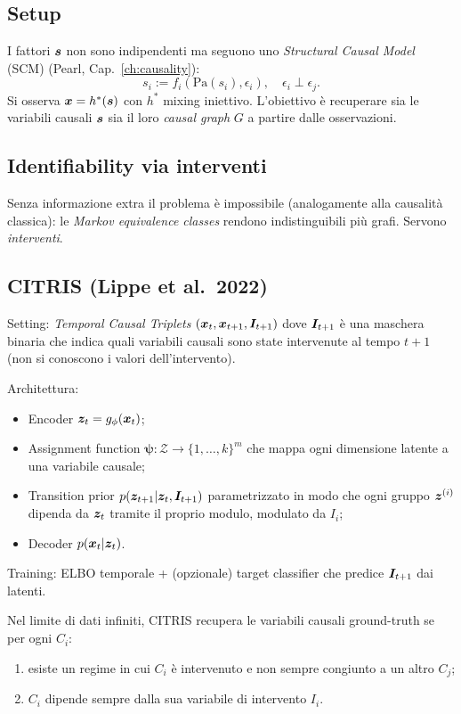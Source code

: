 \subsection{Setup}
I fattori $\bm{s}$ non sono indipendenti ma seguono uno \emph{Structural Causal Model} (SCM) (Pearl, Cap.~\ref{ch:causality}):
\[
s_i := f_i(\mathrm{Pa}(s_i), \epsilon_i), \quad \epsilon_i \perp \epsilon_j.
\]
Si osserva $\bm{x} = h^*(\bm{s})$ con $h^*$ mixing iniettivo. L'obiettivo è recuperare sia le variabili causali $\bm{s}$ sia il loro \emph{causal graph} $G$ a partire dalle osservazioni.

\subsection{Identifiability via interventi}
Senza informazione extra il problema è impossibile (analogamente alla causalità classica): le \emph{Markov equivalence classes} rendono indistinguibili più grafi. Servono \emph{interventi}.

\subsection{CITRIS (Lippe et al.\ 2022)}
Setting: \emph{Temporal Causal Triplets} $(\bm{x}_t, \bm{x}_{t+1}, \bm{I}_{t+1})$ dove $\bm{I}_{t+1}$ è una maschera binaria che indica quali variabili causali sono state intervenute al tempo $t+1$ (non si conoscono i valori dell'intervento).

Architettura:
\begin{itemize}
  \item Encoder $\bm{z}_t = g_\phi(\bm{x}_t)$;
  \item Assignment function $\boldsymbol{\psi}: \mathcal{Z} \to \{1,\dots,k\}^m$ che mappa ogni dimensione latente a una variabile causale;
  \item Transition prior $p(\bm{z}_{t+1} | \bm{z}_t, \bm{I}_{t+1})$ parametrizzato in modo che ogni gruppo $\bm{z}^{(i)}$ dipenda da $\bm{z}_t$ tramite il proprio modulo, modulato da $I_i$;
  \item Decoder $p(\bm{x}_t | \bm{z}_t)$.
\end{itemize}
Training: ELBO temporale + (opzionale) target classifier che predice $\bm{I}_{t+1}$ dai latenti.

\begin{theorem}
Nel limite di dati infiniti, CITRIS recupera le variabili causali ground-truth se per ogni $C_i$:
\begin{enumerate}
  \item esiste un regime in cui $C_i$ è intervenuto e non sempre congiunto a un altro $C_j$;
  \item $C_i$ dipende sempre dalla sua variabile di intervento $I_i$.
\end{enumerate}
\end{theorem}

